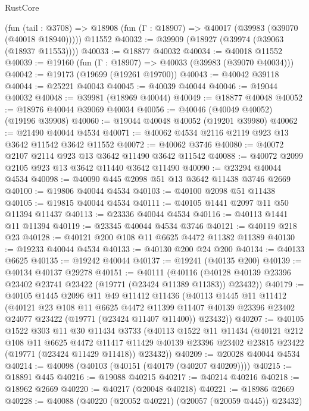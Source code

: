 \begin{lexlean}{RustCore}
\begin{coremodule}
    (fun (tail : @3708) => @18908 (fun (Γ : @18907) => @40017 (@39983 (@39070 (@40018 @18940)))))
    @11552
@40032 := @39909 (@18927 (@39974 (@39063 (@18937 @11553))))
@40033 := @18877 @40032
@40034 := @40018 @11552
@40039 := @19160 (fun (Γ : @18907) => @40033 (@39983 (@39070 @40034)))
@40042 := @19173 (@19699 (@19261 @19700))
@40043 := @40042 @39118
@40044 := @25221 @40043
@40045 := @40039 @40044
@40046 := @19044 @40032
@40048 := @39981 (@18969 @40044)
@40049 := @18877 @40048
@40052 := @18976 @40044 @39069 @40034
@40056 := @40046 (@40049 @40052) (@19196 @39908)
@40060 := @19044 @40048 @40052 (@19201 @39980)
@40062 := @21490 @40044 @4534
@40071 := @40062 @4534 @2116 @2119 @923 @13 @3642 @11542 @3642 @11552
@40072 := @40062 @3746
@40080 := @40072 @2107 @2114 @923 @13 @3642 @11490 @3642 @11542
@40088 := @40072 @2099 @2105 @923 @13 @3642 @11440 @3642 @11490
@40090 := @23294 @40044 @4534
@40098 := @40090 @445 @2098 @51 @13 @3642 @11438 @3746 @2669
@40100 := @19806 @40044 @4534
@40103 := @40100 @2098 @51 @11438
@40105 := @19815 @40044 @4534
@40111 := @40105 @1441 @2097 @11 @50 @11394 @11437
@40113 := @23336 @40044 @4534
@40116 := @40113 @1441 @11 @11394
@40119 := @23345 @40044 @4534 @3746
@40121 := @40119 @218 @23
@40128 := @40121 @200 @108 @11 @6625 @4472 @11382 @11389
@40130 := @19233 @40044 @4534
@40133 := @40130 @200 @24 @200
@40134 := @40133 @6625
@40135 := @19242 @40044
@40137 := @19241 (@40135 @200)
@40139 := @40134 @40137 @29278
@40151 := @40111
    (@40116 (@40128 @40139 @23396 @23402 @23741 @23422 (@19771 (@23424 @11389 @11383)) @23432))
@40179 := @40105
    @1445
    @2096
    @11
    @49
    @11412
    @11436
    (@40113
      @1445
      @11
      @11412
      (@40121
        @23
        @108
        @11
        @6625
        @4472
        @11399
        @11407
        @40139
        @23396
        @23402
        @24077
        @23422
        (@19771 (@23424 @11407 @11400))
        @23432))
@40207 := @40105
    @1522
    @303
    @11
    @30
    @11434
    @3733
    (@40113
      @1522
      @11
      @11434
      (@40121
        @212
        @108
        @11
        @6625
        @4472
        @11417
        @11429
        @40139
        @23396
        @23402
        @23815
        @23422
        (@19771 (@23424 @11429 @11418))
        @23432))
@40209 := @20028 @40044 @4534
@40214 := @40098 (@40103 (@40151 (@40179 (@40207 @40209))))
@40215 := @18891 @445
@40216 := @19088 @40215
@40217 := @40214 @40216
@40218 := @18962 @2669
@40220 := @40217 (@20048 @40218)
@40221 := @18986 @2669
@40228 := @40088 (@40220 (@20052 @40221) (@20057 (@20059 @445)) @23432)

\end{coremodule}
\end{lexlean}
